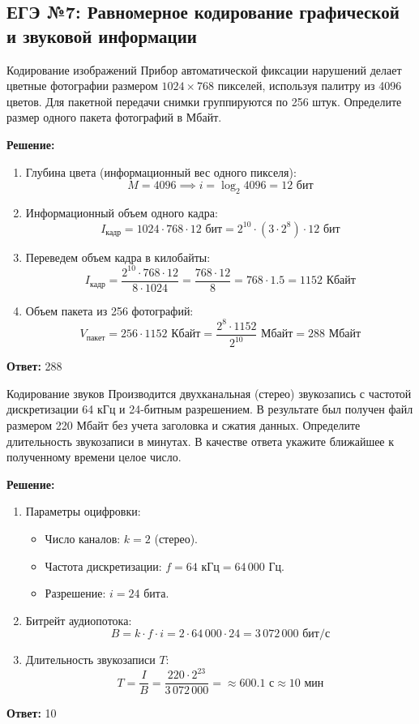 \documentclass[11pt,a4paper]{article}
\begin{document}
\subsection{ЕГЭ №7: Равномерное кодирование графической и звуковой информации}

\begin{taskbox}{Кодирование изображений}
Прибор автоматической фиксации нарушений делает цветные фотографии размером $1024 \times 768$ пикселей, используя палитру из 4096 цветов. Для пакетной передачи снимки группируются по 256 штук. Определите размер одного пакета фотографий в Мбайт.
\end{taskbox}

\textbf{Решение:}
\begin{enumerate}
    \item Глубина цвета (информационный вес одного пикселя):
    $$M = 4096 \implies i = \log_2 4096 = 12 \text{ бит}$$
    \item Информационный объем одного кадра:
    $$I_{\text{кадр}} = 1024 \cdot 768 \cdot 12 \text{ бит} = 2^{10} \cdot (3 \cdot 2^8) \cdot 12 \text{ бит}$$
    \item Переведем объем кадра в килобайты:
    $$I_{\text{кадр}} = \frac{2^{10} \cdot 768 \cdot 12}{8 \cdot 1024} = \frac{768 \cdot 12}{8} = 768 \cdot 1.5 = 1152 \text{ Кбайт}$$
    \item Объем пакета из 256 фотографий:
    $$V_{\text{пакет}} = 256 \cdot 1152 \text{ Кбайт} = \frac{2^8 \cdot 1152}{2^{10}} \text{ Мбайт} = 288 \text{ Мбайт}$$
\end{enumerate}
\textbf{Ответ:} 288

\begin{taskbox}{Кодирование звуков}
Производится двухканальная (стерео) звукозапись с частотой дискретизации 64 кГц и 24-битным разрешением. В результате был получен файл размером 220 Мбайт без учета заголовка и сжатия данных. Определите длительность звукозаписи в минутах. В качестве ответа укажите ближайшее к полученному времени целое число.
\end{taskbox}

\textbf{Решение:}
\begin{enumerate}
    \item Параметры оцифровки:
    \begin{itemize}
        \item Число каналов: $k = 2$ (стерео).
        \item Частота дискретизации: $f = 64\text{ кГц} = 64\,000\text{ Гц}$.
        \item Разрешение: $i = 24\text{ бита}$.
    \end{itemize}
    \item Битрейт аудиопотока:
    $$B = k \cdot f \cdot i = 2 \cdot 64\,000 \cdot 24 = 3\,072\,000 \text{ бит/с}$$
    \item Длительность звукозаписи $T$:
    $$T = \frac{I}{B} = \frac{220 \cdot 2^{23}}{3\,072\,000} = \approx 600.1 \text{ с} \approx 10 \text{ мин}$$
\end{enumerate}
\textbf{Ответ:} 10
\end{document}
